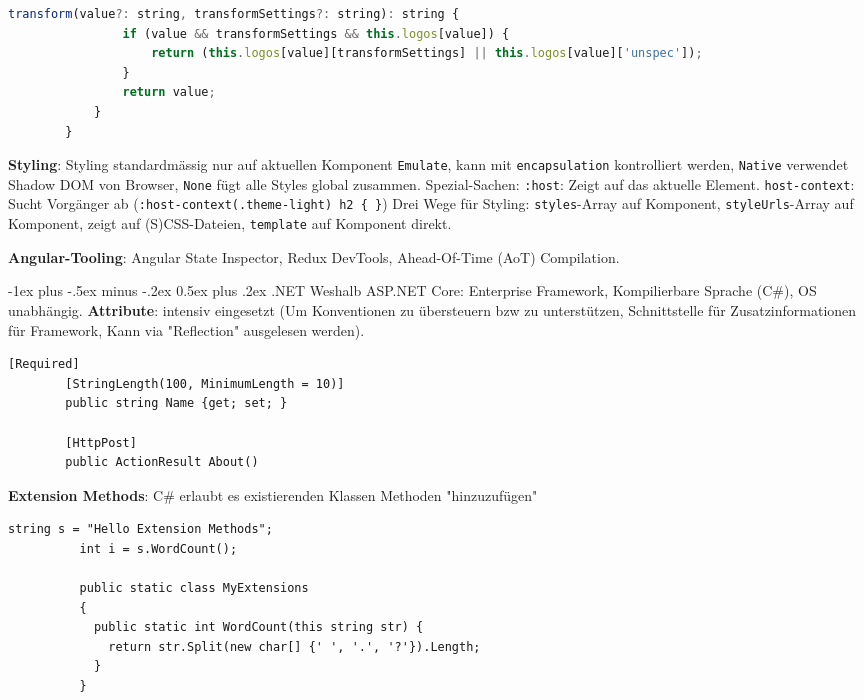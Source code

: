 \documentclass[10pt,landscape]{article}
\makeatletter
\renewcommand{\section}{\@startsection{section}{1}{0mm}%
{-1ex plus -.5ex minus -.2ex}%
{0.5ex plus .2ex}%
{\normalfont\large\bfseries}}
\makeatother
\begin{document}
\begin{multicols}{2}
\begin{lstlisting}[language=JavaScript]
            transform(value?: string, transformSettings?: string): string {
                if (value && transformSettings && this.logos[value]) {
                    return (this.logos[value][transformSettings] || this.logos[value]['unspec']);
                }
                return value;
            }
        }
        \end{lstlisting}

        \textbf{Styling}: Styling standardmässig nur auf aktuellen Komponent \lstinline{Emulate}, kann mit \lstinline{encapsulation} kontrolliert werden, \lstinline{Native} verwendet Shadow DOM von Browser, \lstinline{None} fügt alle Styles global zusammen.
        Spezial-Sachen: \lstinline{:host}: Zeigt auf das aktuelle Element.
        \lstinline{host-context}: Sucht Vorgänger ab (\lstinline!:host-context(.theme-light) h2 { }!)
        Drei Wege für Styling: \lstinline{styles}-Array auf Komponent, \lstinline{styleUrls}-Array auf Komponent, zeigt auf (S)CSS-Dateien, \lstinline{template} auf Komponent direkt.

        \textbf{Angular-Tooling}: Angular State Inspector, Redux DevTools, Ahead-Of-Time (AoT) Compilation.

        \section{.NET}
        Weshalb ASP.NET Core: Enterprise Framework, Kompilierbare Sprache (C\#), OS unabhängig.
        \textbf{Attribute}: intensiv eingesetzt (Um Konventionen zu übersteuern bzw zu unterstützen, Schnittstelle für Zusatzinformationen für Framework, Kann via "Reflection" ausgelesen werden).
        \begin{lstlisting}[style=CSharp]
        [Required]
        [StringLength(100, MinimumLength = 10)]
        public string Name {get; set; }

        [HttpPost]
        public ActionResult About()
        \end{lstlisting}

        \textbf{Extension Methods}: C\# erlaubt es existierenden Klassen Methoden "hinzuzufügen"
        \begin{lstlisting}[style=CSharp]
          string s = "Hello Extension Methods";
          int i = s.WordCount();

          public static class MyExtensions
          {
            public static int WordCount(this string str) {
              return str.Split(new char[] {' ', '.', '?'}).Length;
            }
          }
        \end{lstlisting}


\end{multicols}
\end{document}
